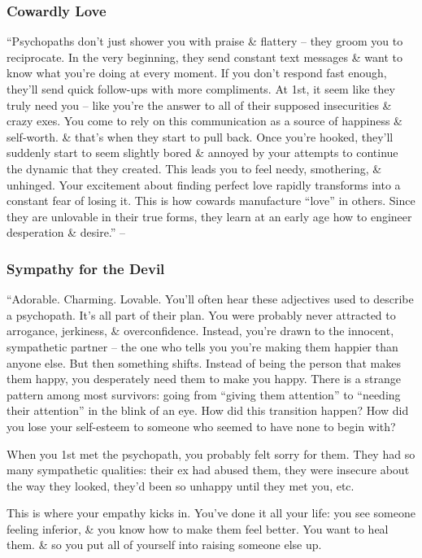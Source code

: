 \documentclass{article}
\numberwithin{equation}{section}
\begin{document}
\subsubsection{Cowardly Love}
``Psychopaths don't just shower you with praise \& flattery -- they groom you to reciprocate. In the very beginning, they send constant text messages \& want to know what you're doing at every moment. If you don't respond fast enough, they'll send quick follow-ups with more compliments. At 1st, it seem like they truly need you -- like you're the answer to all of their supposed insecurities \& crazy exes. You come to rely on this communication as a source of happiness \& self-worth. \& that's when they start to pull back. Once you're hooked, they'll suddenly start to seem slightly bored \& annoyed by your attempts to continue the dynamic that they created. This leads you to feel needy, smothering, \& unhinged. Your excitement about finding perfect love rapidly transforms into a constant fear of losing it. This is how cowards manufacture ``love'' in others. Since they are unlovable in their true forms, they learn at an early age how to engineer desperation \& desire.'' -- \cite[p. 150]{MacKenzie2015}

\subsubsection{Sympathy for the Devil}
``Adorable. Charming. Lovable. You'll often hear these adjectives used to describe a psychopath. It's all part of their plan. You were probably never attracted to arrogance, jerkiness, \& overconfidence. Instead, you're drawn to the innocent, sympathetic partner -- the one who tells you you're making them happier than anyone else. But then something shifts. Instead of being the person that makes them happy, you desperately need them to make you happy. There is a strange pattern among most survivors: going from ``giving them attention'' to ``needing their attention'' in the blink of an eye. How did this transition happen? How did you lose your self-esteem to someone who seemed to have none to begin with?

When you 1st met the psychopath, you probably felt sorry for them. They had so many sympathetic qualities: their ex had abused them, they were insecure about the way they looked, they'd been so unhappy until they met you, etc.

This is where your empathy kicks in. You've done it all your life: you see someone feeling inferior, \& you know how to make them feel better. You want to heal them. \& so you put all of yourself into raising someone else up.
\end{document}
